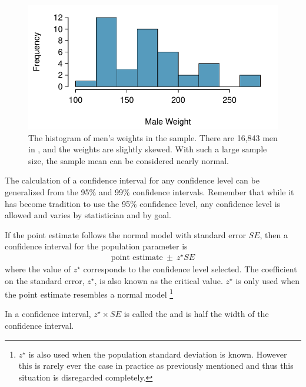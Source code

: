 \begin{figure}
\centering
\includegraphics[width=\textwidth]{ch_inference_foundations_oi_biostat/figures/brfssMenWeight/brfssMenWeight.pdf}
\caption{The histogram of men's weights in the  sample. There are 16,843 men in , and the weights are slightly skewed. With such a large sample size, the sample mean can be considered nearly normal.}
\label{brfssMenWeight}
\end{figure}

The calculation of a confidence interval for any confidence level can be generalized from the 95\% and 99\% confidence intervals. Remember that while it has become tradition to use the 95\% confidence level, any confidence level is allowed and varies by statistician and by goal. 

\begin{termBox}{
If the point estimate follows the normal model with standard error $SE$, then a confidence interval for the population parameter is
\begin{eqnarray*}
\text{point estimate}\ \pm\ z^{\star} SE
\end{eqnarray*}
where the value of $z^{\star}$ corresponds to the confidence level selected. The coefficient on the standard error, $z^{\star}$, is also known as the critical value. $z^{\star}$ is only used when the point estimate resembles a normal model \footnote{$z^{\star}$ is also used when the population standard deviation is known. However this is rarely ever the case in practice as previously mentioned and thus this situation is disregarded completely.}}
\end{termBox}
\begin{termBox}{
\label{marginOfErrorTermBox}In a confidence interval, $z^{\star}\times SE$ is called the  and is half the width of the confidence interval.}
\end{termBox}

